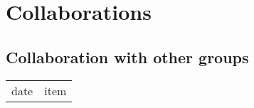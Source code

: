 \chapter{Collaborations}


\section{Collaboration with other groups}

\begin{tabular}[l]{ p{} p{} }
date & item\\
\end{tabular} 


